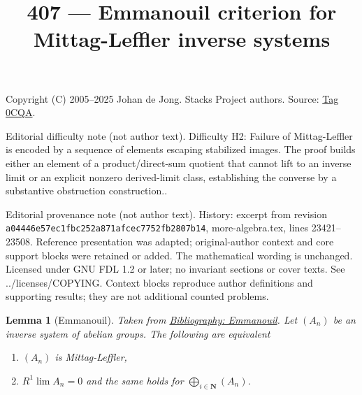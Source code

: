 \documentclass{amsart}
\newenvironment{reference}{\comment}{\endcomment}
\theoremstyle{plain}
\newtheorem{lemma}[subsection]{Lemma}
\theoremstyle{definition}
\theoremstyle{remark}
\numberwithin{equation}{subsection}
\def\lim{\mathop{\mathrm{lim}}\nolimits}
\begin{document}
\title[Stacks Project, Tag 0CQA]{407 --- Emmanouil criterion for Mittag-Leffler inverse systems}
\maketitle
\noindent Copyright (C) 2005--2025 Johan de Jong. Stacks Project authors. Source: \href{https://stacks.math.columbia.edu/tag/0CQA}{Tag 0CQA}.

\noindent Editorial difficulty note (not author text). Difficulty H2: Failure of Mittag-Leffler is encoded by a sequence of elements escaping stabilized images. The proof builds either an element of a product/direct-sum quotient that cannot lift to an inverse limit or an explicit nonzero derived-limit class, establishing the converse by a substantive obstruction construction..

\noindent Editorial provenance note (not author text). History: excerpt from revision \texttt{a0444\allowbreak 6e57e\allowbreak c1fbc\allowbreak 252a8\allowbreak 71afc\allowbreak ec775\allowbreak 2fb28\allowbreak 07b14}, more-algebra.tex, lines 23421--23508. Reference presentation was adapted; original-author context and core support blocks were retained or added. The mathematical wording is unchanged. Licensed under GNU FDL 1.2 or later; no invariant sections or cover texts. See ../licenses/COPYING. Context blocks reproduce author definitions and supporting results; they are not additional counted problems.

\begin{lemma}[Emmanouil]
\label{lemma-emmanouil}
\begin{reference}
Taken from \href{https://stacks.math.columbia.edu/bibliography}{Bibliography: Emmanouil}.
\end{reference}
Let $(A_n)$ be an inverse system of abelian groups.
The following are equivalent
\begin{enumerate}
\item $(A_n)$ is Mittag-Leffler,
\item $R^1\lim A_n = 0$ and
the same holds for $\bigoplus_{i \in \mathbf{N}} (A_n)$.
\end{enumerate}
\end{lemma}
\end{document}
